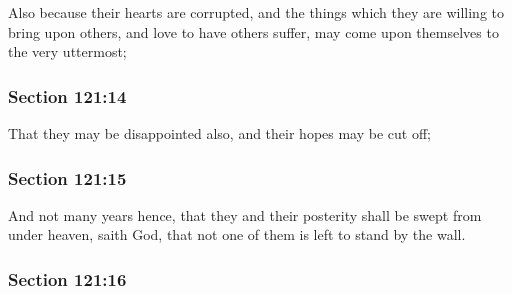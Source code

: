		Also because their hearts are corrupted, and the things which they are willing to bring upon others, and love to have others suffer, may come upon themselves to the very uttermost;


	\subsubsection{Section 121:14} %
		\label{DC121-14}

		That they may be disappointed also, and their hopes may be cut off;


	\subsubsection{Section 121:15} %
		\label{DC121-15}

		And not many years hence, that they and their posterity shall be swept from under heaven, saith God, that not one of them is left to stand by the wall.


	\subsubsection{Section 121:16} %
		\label{DC121-16}

